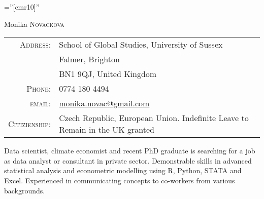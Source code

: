 \documentclass[a4paper,10pt]{article}
\begin{document}

\pagestyle{empty} %

\font\fb=''[cmr10]'' %

\par{\centering
		{\Huge Monika \textsc{Novackova}
	}\bigskip\par}


\begin{tabular}{rl}
 
    \textsc{Address:}   & School of Global Studies, University of Sussex \\
 & Falmer, Brighton\\
  &BN1 9QJ, United Kingdom\\
    \textsc{Phone:}     & 0774 180 4494\\
    \textsc{email:}     & \href{mailto:monika.novac@gmail.com}{monika.novac@gmail.com}\\
    
       \textsc{Citizienship:} & Czech Republic, European Union. Indefinite Leave to Remain in the UK granted
\end{tabular}

Data scientist, climate economist and recent PhD graduate is searching for a job as data analyst or consultant in private sector. Demonstrable skills in advanced statistical analysis and econometric modelling using R, Python, STATA and Excel. Experienced in communicating concepts to co-workers from various backgrounds.



\end{document}
